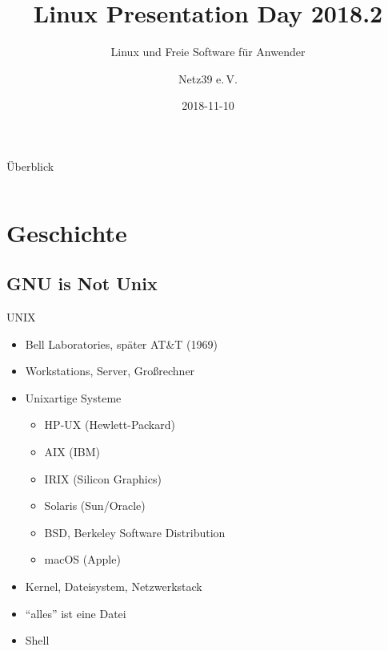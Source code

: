 \documentclass{beamer}
\title{Linux Presentation Day 2018.2}
\subtitle{Linux und Freie Software für Anwender}
\author{Netz39 e.\,V.}
\institute{\url{http://www.netz39.de/}}
\date{2018-11-10}
\begin{document}
\begin{frame}
	\titlepage
\end{frame}

\logo{}

\begin{frame}{Überblick}
    \begin{columns}[T]
        \begin{column}{0.5\textwidth}
            \tableofcontents
        \end{column}
        \begin{column}{0.5\textwidth}
            
        \end{column}
    \end{columns}
\end{frame}

\section{Geschichte}

\frame{\tableofcontents[currentsection]}

\subsection{GNU is Not Unix}

\begin{frame}{UNIX}
    \begin{itemize}
        \item Bell Laboratories, später AT\&T (1969)
        \item Workstations, Server, Großrechner
        \item Unixartige Systeme
            \begin{itemize}
                \item HP-UX (Hewlett-Packard)
                \item AIX (IBM)
                \item IRIX (Silicon Graphics)
                \item Solaris (Sun/Oracle)
                \item BSD, Berkeley Software Distribution
                \item macOS (Apple)
            \end{itemize}
        \item Kernel, Dateisystem, Netzwerkstack
        \item \enquote{alles} ist eine Datei
        \item Shell
    \end{itemize}
\end{frame}
\end{document}
